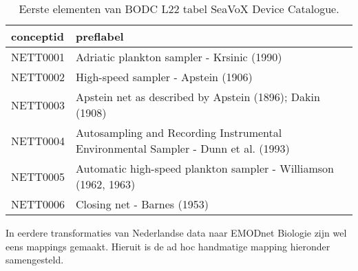 \documentclass[
]{book}
\begin{document}
\begin{table}

\caption{\label{tab:bodcBemonsteringsapparaat}Eerste elementen van BODC L22 tabel SeaVoX Device Catalogue.}
\centering
\begin{tabular}[t]{l|l}
\hline
conceptid & preflabel\\
\hline
NETT0001 & Adriatic plankton sampler - Krsinic (1990)\\
\hline
NETT0002 & High-speed sampler - Apstein (1906)\\
\hline
NETT0003 & Apstein net as described by  Apstein (1896); Dakin (1908)\\
\hline
NETT0004 & Autosampling and Recording Instrumental Environmental Sampler - Dunn et al. (1993)\\
\hline
NETT0005 & Automatic high-speed plankton sampler - Williamson (1962, 1963)\\
\hline
NETT0006 & Closing net - Barnes (1953)\\
\hline
\end{tabular}
\end{table}

In eerdere transformaties van Nederlandse data naar EMODnet Biologie zijn wel eens mappings gemaakt. Hieruit is de ad hoc handmatige mapping hieronder samengesteld.
\end{document}
